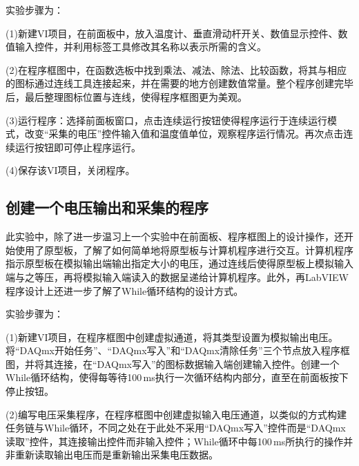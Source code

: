 \documentclass[UTF8]{article}
\theoremstyle{MyLineTheoremStyle} %
\theoremstyle{MyBlockTheoremStyle} %
\theoremstyle{MySubsubsectionStyle} %
\begin{document}

实验步骤为：

(1)新建VI项目，在前面板中，放入温度计、垂直滑动杆开关、数值显示控件、数值输入控件，并利用标签工具修改其名称以表示所需的含义。

(2)在程序框图中，在函数选板中找到乘法、减法、除法、比较函数，将其与相应的图标通过连线工具连接起来，并在需要的地方创建数值常量。整个程序创建完毕后，最后整理图标位置与连线，使得程序框图更为美观。

(3)运行程序：选择前面板窗口，点击连续运行按钮使得程序运行于连续运行模式，改变“采集的电压”控件输入值和温度值单位，观察程序运行情况。再次点击连续运行按钮即可停止程序运行。

(4)保存该VI项目，关闭程序。

\subsection{创建一个电压输出和采集的程序}
此实验中，除了进一步温习上一个实验中在前面板、程序框图上的设计操作，还开始使用了原型板，了解了如何简单地将原型板与计算机程序进行交互。计算机程序指示原型板在模拟输出端输出指定大小的电压，通过连线后使得原型板上模拟输入端与之等压，再将模拟输入端读入的数据呈递给计算机程序。此外，再LabVIEW程序设计上还进一步了解了While循环结构的设计方式。


实验步骤为：

(1)新建VI项目，在程序框图中创建虚拟通道，将其类型设置为模拟输出电压。将“DAQmx开始任务”、“DAQmx写入”和“DAQmx清除任务”三个节点放入程序框图，并将其连接，在“DAQmx写入”的图标数据输入端创建输入控件。创建一个While循环结构，使得每等待100\,ms执行一次循环结构内部分，直至在前面板按下停止按钮。

(2)编写电压采集程序，在程序框图中创建虚拟输入电压通道，以类似的方式构建任务链与While循环，不同之处在于此处不采用“DAQmx写入”控件而是“DAQmx读取”控件，其连接输出控件而非输入控件；While循环中每100\,ms所执行的操作并非重新读取输出电压而是重新输出采集电压数据。
\end{document}
